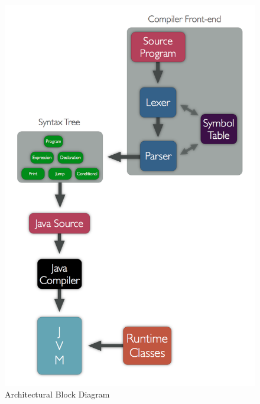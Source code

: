 \documentclass[letterpaper,oneside,12pt, pdftex]{report}
\begin{document}
\begin{figure}[htbp]
  \centering
  \includegraphics[scale=0.46]{blocks_scaled.png}
  \caption{Architectural Block Diagram}
  \label{blockdiagram}
\end{figure}
\end{document}
